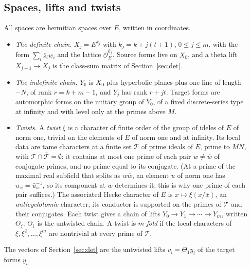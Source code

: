 \documentclass[11pt]{amsart}
\numberwithin{equation}{section}
\theoremstyle{definition}
\theoremstyle{remark}
\newcommand{\cO}{\mathcal O}
\begin{document}
\subsection*{Spaces, lifts and twists}
All spaces are hermitian spaces over $E$, written in coordinates.
\begin{itemize}[leftmargin=2em]
\item \emph{The definite chain.} $X_j=E^{k_j}$ with $k_j=k+j(t+1)$, $0\le j\le m$, with the form $\sum_i\bar z_iw_i$ and the lattice $\cO_E^{k_j}$. Source forms live on $X_0$, and a theta lift $X_{j-1}\to X_j$ is the class-sum matrix of Section~\ref{sec:det}.
\item \emph{The indefinite chain.} $Y_0$ is $X_0$ plus hyperbolic planes plus one line of length $-N$, of rank $r=k+m-1$, and $Y_j$ has rank $r+jt$. Target forms are automorphic forms on the unitary group of $Y_0$, of a fixed discrete-series type at infinity and with level only at the primes above $M$.
\item \emph{Twists.} A \emph{twist} $\xi$ is a character of finite order of the group of ideles of $E$ of norm one, trivial on the elements of $E$ of norm one and at infinity. Its local data are tame characters at a finite set $\mathcal T$ of prime ideals of $E$, prime to $MN$, with $\mathcal T\cap\bar{\mathcal T}=\emptyset$: it contains at most one prime of each pair $w\ne\bar w$ of conjugate primes, and no prime equal to its conjugate. (At a prime of the maximal real subfield that splits as $w\bar w$, an element $u$ of norm one has $u_{\bar w}=\bar u_w^{-1}$, so its component at $w$ determines it; this is why one prime of each pair suffices.) The associated Hecke character of $E$ is $x\mapsto\xi(x/\bar x)$, an \emph{anticyclotomic} character; its conductor is supported on the primes of $\mathcal T$ and their conjugates. Each twist gives a chain of lifts $Y_0\to Y_1\to\cdots\to Y_m$, written $\Theta_\xi$; $\Theta_1$ is the untwisted chain. A twist is \emph{$m$-fold} if the local characters of $\xi,\xi^2,\dots,\xi^m$ are nontrivial at every prime of $\mathcal T$.
\end{itemize}
The vectors of Section~\ref{sec:det} are the untwisted lifts $v_i=\Theta_1y_i$ of the target forms $y_i$.
\end{document}
